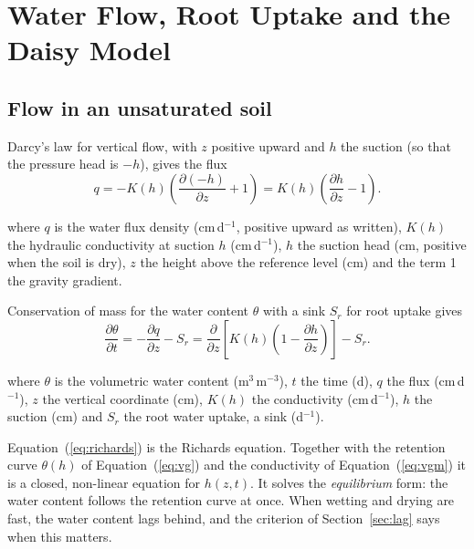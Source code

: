 \chapter{Water Flow, Root Uptake and the Daisy Model}\label{chap:02}
\section{Flow in an unsaturated soil}
Darcy's law for vertical flow, with $z$ positive upward and $h$ the suction (so that the pressure head is $-h$), gives the flux
\begin{equation}\label{eq:darcy}\boxed{q = -K(h)\left(\frac{\partial(-h)}{\partial z}+1\right)=K(h)\left(\frac{\partial h}{\partial z}-1\right).}\end{equation}
\par\noindent where $q$ is the water flux density (cm\,d$^{-1}$, positive upward as written), $K(h)$ the hydraulic conductivity at suction $h$ (cm\,d$^{-1}$), $h$ the suction head (cm, positive when the soil is dry), $z$ the height above the reference level (cm) and the term 1 the gravity gradient.

Conservation of mass for the water content $\theta$ with a sink $S_r$ for root uptake gives
\begin{equation}\label{eq:richards}\boxed{\frac{\partial\theta}{\partial t}=-\frac{\partial q}{\partial z}-S_r=\frac{\partial}{\partial z}\left[K(h)\left(1-\frac{\partial h}{\partial z}\right)\right]-S_r .}\end{equation}
\par\noindent where $\theta$ is the volumetric water content (m$^3$\,m$^{-3}$), $t$ the time (d), $q$ the flux (cm\,d$^{-1}$), $z$ the vertical coordinate (cm), $K(h)$ the conductivity (cm\,d$^{-1}$), $h$ the suction (cm) and $S_r$ the root water uptake, a sink (d$^{-1}$).

Equation~(\ref{eq:richards}) is the Richards equation. Together with the retention curve $\theta(h)$ of Equation~(\ref{eq:vg}) and the conductivity of Equation~(\ref{eq:vgm}) it is a closed, non-linear equation for $h(z,t)$. It solves the \emph{equilibrium} form: the water content follows the retention curve at once. When wetting and drying are fast, the water content lags behind, and the criterion of Section~\ref{sec:lag} says when this matters.

